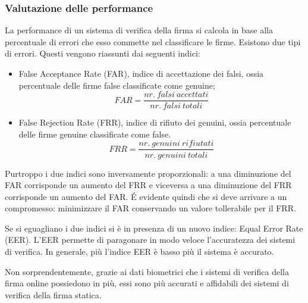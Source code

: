 \subsubsection{Valutazione delle performance}
\label{2.1.1}
La performance di un sistema di verifica della firma si calcola in base alla percentuale di errori che esso commette nel classificare le firme. Esistono due tipi di errori. Questi vengono riassunti dai seguenti indici:
\begin{itemize}
\item False Acceptance Rate (FAR), indice di accettazione dei falsi, ossia percentuale delle firme false classificate come genuine;
\[FAR =
\frac{nr.\ falsi\ accettati}{nr.\ falsi\ totali}
\]
\item False Rejection Rate (FRR), indice di rifiuto dei genuini, ossia percentuale delle firme genuine classificate come false.
\[FRR =
\frac{nr.\ genuini\ rifiutati}{nr.\ genuini\ totali}
\]
\end{itemize}
Purtroppo i due indici sono inversamente proporzionali: a una diminuzione del FAR corrisponde un aumento del FRR e viceversa a una diminuzione del FRR corrisponde un aumento del FAR. \'{E} evidente quindi che si deve arrivare a un compromesso: minimizzare il FAR conservando un valore tollerabile per il FRR.

Se si eguagliano i due indici si è in presenza di un nuovo indice: Equal Error Rate (EER). L'EER permette di paragonare in modo veloce l'accuratezza dei sistemi di verifica. In generale, più l'indice EER è basso più il sistema è accurato.

Non sorprendentemente, grazie ai dati biometrici che i sistemi di verifica della firma online possiedono in più, essi sono più accurati e affidabili dei sistemi di verifica della firma statica.

